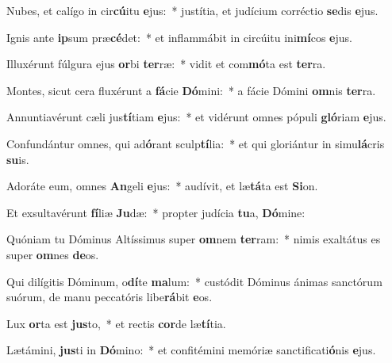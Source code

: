 \item Nubes, et calígo in cir\textbf{cú}itu \textbf{e}jus:~* justítia, et judícium corréctio \textbf{se}dis \textbf{e}jus.
\item Ignis ante \textbf{ip}sum præ\textbf{cé}det:~* et inflammábit in circúitu ini\textbf{mí}cos \textbf{e}jus.
\item Illuxérunt fúlgura ejus \textbf{or}bi \textbf{ter}ræ:~* vidit et com\textbf{mó}ta est \textbf{ter}ra.
\item Montes, sicut cera fluxérunt a \textbf{fá}cie \textbf{Dó}mini:~* a fácie Dómini \textbf{om}nis \textbf{ter}ra.
\item Annuntiavérunt cæli jus\textbf{tí}tiam \textbf{e}jus:~* et vidérunt omnes pópuli \textbf{gló}riam \textbf{e}jus.
\item Confundántur omnes, qui ad\textbf{ó}rant sculp\textbf{tí}lia:~* et qui gloriántur in simu\textbf{lá}cris \textbf{su}is.
\item Adoráte eum, omnes \textbf{An}geli \textbf{e}jus:~* audívit, et læ\textbf{tá}ta est \textbf{Si}on.
\item Et exsultavérunt \textbf{fí}liæ \textbf{Ju}dæ:~* propter judícia \textbf{tu}a, \textbf{Dó}mine:
\item Quóniam tu Dóminus Altíssimus super \textbf{om}nem \textbf{ter}ram:~* nimis exaltátus es super \textbf{om}nes \textbf{de}os.
\item Qui dilígitis Dóminum, o\textbf{dí}te \textbf{ma}lum:~* custódit Dóminus ánimas sanctórum suórum, de manu peccatóris libe\textbf{rá}bit \textbf{e}os.
\item Lux \textbf{or}ta est \textbf{jus}to,~* et rectis \textbf{cor}de læ\textbf{tí}tia.
\item Lætámini, \textbf{jus}ti in \textbf{Dó}mino:~* et confitémini memóriæ sanctificati\textbf{ó}nis \textbf{e}jus.

